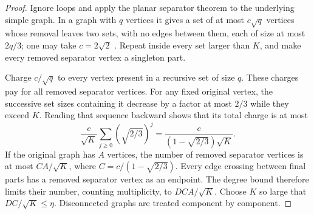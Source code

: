 \begin{proof}
Ignore loops and apply the planar separator theorem to the underlying
simple graph.  In a graph with $q$ vertices it gives a set of at most
$c\sqrt q$ vertices whose removal leaves two sets, with no edges
between them, each of size at most $2q/3$; one may take
$c=2\sqrt2$ \cite[Corollary~2]{LiptonTarjan1979}.  Repeat inside every set larger
than $K$, and make every removed separator vertex a singleton part.

Charge $c/\sqrt q$ to every vertex present in a recursive set of size
$q$.  These charges pay for all removed separator vertices.  For any
fixed original vertex, the successive set sizes containing it decrease
by a factor at most $2/3$ while they exceed $K$.  Reading that sequence
backward shows that its total charge is at most
\[
 \frac{c}{\sqrt K}\sum_{j\ge0}(\sqrt{2/3})^j
       =\frac{c}{(1-\sqrt{2/3})\sqrt K}.
\]
If the original graph has $A$ vertices, the number of removed
separator vertices is at most $C A/\sqrt K$, where
$C=c/(1-\sqrt{2/3})$.  Every edge crossing between final parts has a
removed separator vertex as an endpoint.  The degree bound therefore
limits their number, counting multiplicity, to $DC A/\sqrt K$.
Choose $K$ so large that $DC/\sqrt K\le\eta$.  Disconnected graphs
are treated component by component.
\end{proof}

